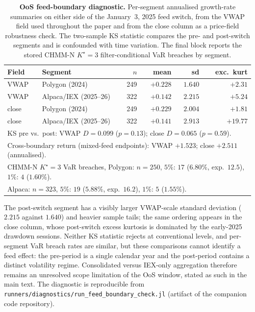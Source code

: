 \begin{table}[!ht]
\centering
\small
\caption{\textbf{OoS feed-boundary diagnostic.} Per-segment annualised growth-rate summaries on either side of the January~3, 2025 feed switch, from the VWAP field used throughout the paper and from the close column as a price-field robustness check. The two-sample KS statistic compares the pre- and post-switch segments and is confounded with time variation. The final block reports the stored CHMM-N $K^\star = 3$ filter-conditional VaR breaches by segment.}
\label{tab:feed_boundary}
\begin{tabular}{llrrrr}
\toprule
Field & Segment & $n$ & mean & sd & exc.\ kurt \\
\midrule
VWAP  & Polygon (2024)          & 249 & $+0.228$ & $1.640$ & $+2.31$ \\
VWAP  & Alpaca/IEX (2025--26)   & 322 & $+0.142$ & $2.215$ & $+5.24$ \\
close & Polygon (2024)          & 249 & $+0.229$ & $2.004$ & $+1.81$ \\
close & Alpaca/IEX (2025--26)   & 322 & $+0.141$ & $2.913$ & $+19.77$ \\
\midrule
\multicolumn{6}{l}{KS pre vs.\ post: VWAP $D = 0.099$ ($p = 0.13$); close $D = 0.065$ ($p = 0.59$).} \\
\multicolumn{6}{l}{Cross-boundary return (mixed-feed endpoints): VWAP $+1.523$; close $+2.511$ (annualised).} \\
\midrule
\multicolumn{6}{l}{CHMM-N $K^\star{=}3$ VaR breaches, Polygon: $n = 250$, $5\%$: $17$ ($6.80\%$, exp.\ $12.5$), $1\%$: $4$ ($1.60\%$).} \\
\multicolumn{6}{l}{\phantom{CHMM-N $K^\star{=}3$ VaR breaches,} Alpaca: $n = 323$, $5\%$: $19$ ($5.88\%$, exp.\ $16.2$), $1\%$: $5$ ($1.55\%$).} \\
\bottomrule
\end{tabular}
\end{table}

The post-switch segment has a visibly larger VWAP-scale standard deviation ($2.215$ against $1.640$) and heavier sample tails; the same ordering appears in the close column, whose post-switch excess kurtosis is dominated by the early-2025 drawdown sessions. Neither KS statistic rejects at conventional levels, and per-segment VaR breach rates are similar, but these comparisons cannot identify a feed effect: the pre-period is a single calendar year and the post-period contains a distinct volatility regime. Consolidated versus IEX-only aggregation therefore remains an unresolved scope limitation of the OoS window, stated as such in the main text. The diagnostic is reproducible from \texttt{runners/diagnostics/run\_feed\_boundary\_check.jl} (artifact  of the companion code repository).

